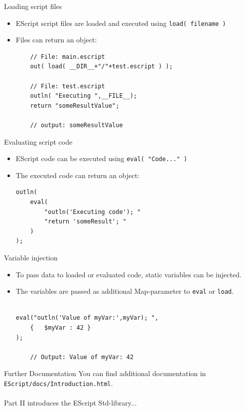 \documentclass[ucs,9pt]{beamer}
\begin{document}
\begin{frame}[fragile]{Loading script files}
\begin{itemize}
	\item EScript script files are loaded and executed using \lstinline!load( filename )!
	\item Files can return an object:
		\begin{lstlisting}	
	// File: main.escript
	out( load( __DIR__+"/"+test.escript ) );
	
	// File: test.escript
	outln( "Executing ",__FILE__);
	return "someResultValue";

	// output: someResultValue
		\end{lstlisting}	
\end{itemize}
\end{frame}

\begin{frame}[fragile]{Evaluating script code}
\begin{itemize}
\item EScript code can be executed using \lstinline!eval( "Code..." )!
\item The executed code can return an object:
		\begin{lstlisting}
outln(
	eval(	
		"outln('Executing code'); "
		"return 'someResult'; "
	)
);
		\end{lstlisting}
\end{itemize}
\end{frame}

\begin{frame}[fragile]{Variable injection}
\begin{itemize}
	\item To pass data to loaded or evaluated code, static variables can be injected.
	\item The variables are passed as additional Map-parameter to \lstinline!eval! or \lstinline!load!.
			\begin{lstlisting}

eval("outln('Value of myVar:',myVar); ",
	{	$myVar : 42 }
);

	// Output: Value of myVar: 42
		\end{lstlisting}
\end{itemize}
\end{frame}


%
%
%

%
%
\begin{frame}{Further Documentation}
	You can find additional documentation in \texttt{EScript/docs/Introduction.html}. \\
	\hspace{2cm}\\
	Part II introduces the EScript Std-library...
\end{frame}
\end{document}
